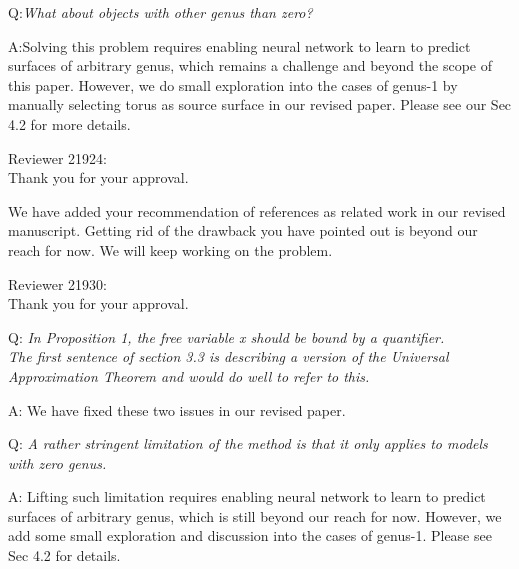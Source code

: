 \documentclass[10pt]{letter} %
\begin{document}
	Q:\emph{What about objects with other genus than zero?}
	
	A:Solving this problem requires enabling neural network to learn to predict surfaces of arbitrary genus, which remains a challenge and beyond the scope of this paper. However, we do small exploration into the cases of genus-1 by manually selecting torus as source surface in our revised paper. Please see our Sec 4.2 for more details.
	
	\hdashrule{\linewidth}{1pt}{1mm}
	Reviewer 21924:\\
	Thank you for your approval. 
	
	We have added your recommendation of references as related work in our revised manuscript. Getting rid of the drawback you have pointed out is beyond our reach for now. We will keep working on the problem.
	  
	
	\hdashrule{\linewidth}{1pt}{1mm}
	Reviewer 21930:\\
	Thank you for your approval.
	
	Q: \emph{In Proposition 1, the free variable x should be bound by a quantifier.
		\\The first sentence of section 3.3 is describing a version of the Universal Approximation Theorem and would do well to refer to this.}
	
	A: We have fixed these two issues in our revised paper.
	
	Q:\emph{ A rather stringent limitation of the method is that it only applies to models with zero genus.}
	
	A: Lifting such limitation requires enabling neural network to learn to predict surfaces of arbitrary genus, which is still beyond our reach for now. However, we add some small exploration and discussion into the cases of genus-1. Please see Sec 4.2 for details. 

	
\end{document}
